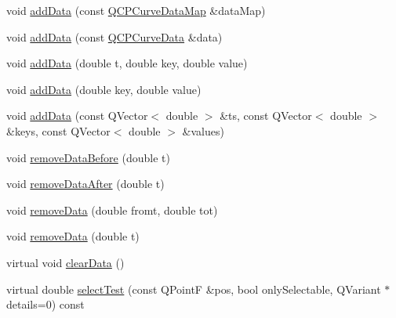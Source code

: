 \begin{DoxyCompactItemize}
\item 
void \mbox{\hyperlink{class_q_c_p_curve_a4e24023c3b9ac75440c7a260172c99af}{add\+Data}} (const \mbox{\hyperlink{qcustomplot_8h_a444d37ec9cb2951b3a7fe443c34d1658}{Q\+C\+P\+Curve\+Data\+Map}} \&data\+Map)
\item 
void \mbox{\hyperlink{class_q_c_p_curve_ad304326aba096911f92452d8bfe0470e}{add\+Data}} (const \mbox{\hyperlink{class_q_c_p_curve_data}{Q\+C\+P\+Curve\+Data}} \&data)
\item 
void \mbox{\hyperlink{class_q_c_p_curve_a13398b236f6926014e404eeb5b9f415c}{add\+Data}} (double t, double key, double value)
\item 
void \mbox{\hyperlink{class_q_c_p_curve_ada4762e793cd5707b33f35b8a4b0f8fb}{add\+Data}} (double key, double value)
\item 
void \mbox{\hyperlink{class_q_c_p_curve_a27c8b3dddd4067d626397ee199626722}{add\+Data}} (const Q\+Vector$<$ double $>$ \&ts, const Q\+Vector$<$ double $>$ \&keys, const Q\+Vector$<$ double $>$ \&values)
\item 
void \mbox{\hyperlink{class_q_c_p_curve_af6f4284fbc2f34e676f24dce03c34fe5}{remove\+Data\+Before}} (double t)
\item 
void \mbox{\hyperlink{class_q_c_p_curve_a0365cb947c4e6d405ee22e00191d5f52}{remove\+Data\+After}} (double t)
\item 
void \mbox{\hyperlink{class_q_c_p_curve_ad45bb5479be799163028ef2b776f7221}{remove\+Data}} (double fromt, double tot)
\item 
void \mbox{\hyperlink{class_q_c_p_curve_a30c91acfa591ec534c49fed4c0fca39a}{remove\+Data}} (double t)
\item 
virtual void \mbox{\hyperlink{class_q_c_p_curve_ae0462c61dbfbac07db0736ec64110241}{clear\+Data}} ()
\item 
virtual double \mbox{\hyperlink{class_q_c_p_curve_a87a9fb34a2a48dcae4c1245ada235e7d}{select\+Test}} (const Q\+PointF \&pos, bool only\+Selectable, Q\+Variant $\ast$details=0) const
\end{DoxyCompactItemize}
